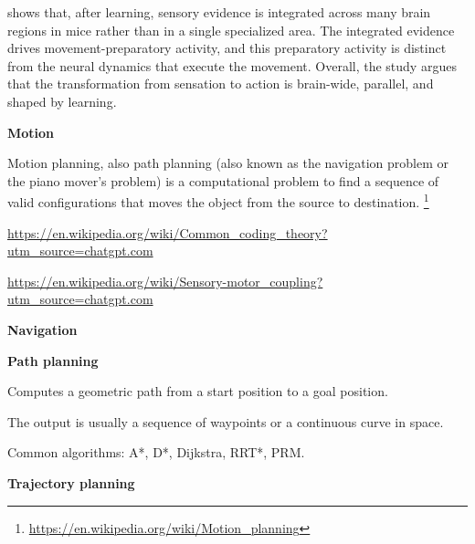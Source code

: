 \documentclass{book}
\providecommand{\ProjectDeepHeading}[2]{%
    \par\medskip\noindent\textbf{#2}\par\smallskip
}
\providecommand{\seeherefooter}[1]{\footnote{\url{#1}}}
\begin{document}

\cite{khilkevich-2024-brain-wide-dynamics-linking-sensation-to-action-during-decision-making}  shows that, after learning, sensory evidence is integrated across many brain regions in mice rather than in a single specialized area. The integrated evidence drives movement-preparatory activity, and this preparatory activity is distinct from the neural dynamics that execute the movement. Overall, the study argues that the transformation from sensation to action is brain-wide, parallel, and shaped by learning.

\ProjectDeepHeading{5}{Motion}


Motion planning, also path planning (also known as the navigation problem or the piano mover's problem) is a computational problem to find a sequence of valid configurations that moves the object from the source to destination.
    \seeherefooter{https://en.wikipedia.org/wiki/Motion_planning}


\url{https://en.wikipedia.org/wiki/Common_coding_theory?utm_source=chatgpt.com}
    
    \url{https://en.wikipedia.org/wiki/Sensory-motor_coupling?utm_source=chatgpt.com}

\ProjectDeepHeading{6}{Navigation}


%

\ProjectDeepHeading{7}{Path planning}


Computes a geometric path from a start position to a goal position.
    
    The output is usually a sequence of waypoints or a continuous curve in space.
    
    Common algorithms: A*, D*, Dijkstra, RRT*, PRM.

\ProjectDeepHeading{7}{Trajectory planning}
\end{document}
